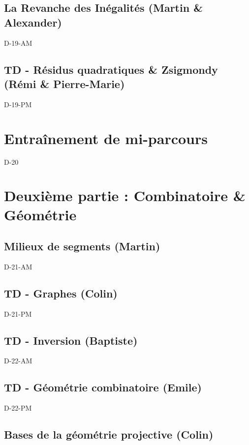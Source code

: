 \documentclass[poly,trombi]{valbonne}
\begin{document}
\subsection{La Revanche des Inégalités (Martin \& Alexander)}

{D-19-AM}

\subsection{TD - Résidus quadratiques \& Zsigmondy (Rémi \& Pierre-Marie)}
{D-19-PM}


\section{Entraînement de mi-parcours}

{D-20}


\section{Deuxième partie : Combinatoire \& Géométrie}

\subsection{Milieux de segments (Martin)}

{D-21-AM}

\subsection{TD - Graphes (Colin)}

{D-21-PM}

\subsection{TD - Inversion (Baptiste)}

{D-22-AM}

\subsection{TD - Géométrie combinatoire (Emile)}

{D-22-PM}

\subsection{Bases de la géométrie projective (Colin)}
\end{document}
